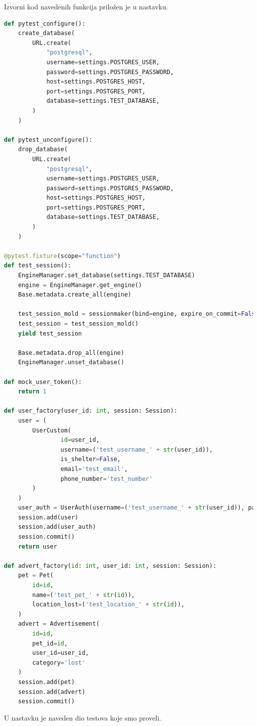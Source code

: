 			Izvorni kod navedenih funkcija priložen je u nastavku.
			\begin{lstlisting}[language=Python]
def pytest_configure():
    create_database(
        URL.create(
            "postgresql",
            username=settings.POSTGRES_USER,
            password=settings.POSTGRES_PASSWORD,
            host=settings.POSTGRES_HOST,
            port=settings.POSTGRES_PORT,
            database=settings.TEST_DATABASE,
        )
    )

def pytest_unconfigure():
    drop_database(
        URL.create(
            "postgresql",
            username=settings.POSTGRES_USER,
            password=settings.POSTGRES_PASSWORD,
            host=settings.POSTGRES_HOST,
            port=settings.POSTGRES_PORT,
            database=settings.TEST_DATABASE,
        )
    )

@pytest.fixture(scope="function")
def test_session():
    EngineManager.set_database(settings.TEST_DATABASE)
    engine = EngineManager.get_engine()
    Base.metadata.create_all(engine)

    test_session_mold = sessionmaker(bind=engine, expire_on_commit=False)
    test_session = test_session_mold()
    yield test_session

    Base.metadata.drop_all(engine)
    EngineManager.unset_database()

def mock_user_token():
    return 1

def user_factory(user_id: int, session: Session):
    user = (
        UserCustom(
                id=user_id,
                username=('test_username_' + str(user_id)),
                is_shelter=False,
                email='test_email',
                phone_number='test_number'
        )
    )
    user_auth = UserAuth(username=('test_username_' + str(user_id)), password='1234')
    session.add(user)
    session.add(user_auth)
    session.commit()
    return user

def advert_factory(id: int, user_id: int, session: Session):
    pet = Pet(
        id=id,
        name=('test_pet_' + str(id)),
        location_lost=('test_location_' + str(id)),
    )
    advert = Advertisement(
        id=id,
        pet_id=id,
        user_id=user_id,
        category='lost'
    )
    session.add(pet)
    session.add(advert)
    session.commit()
			\end{lstlisting}

			U nastavku je naveden dio testova koje smo proveli.

